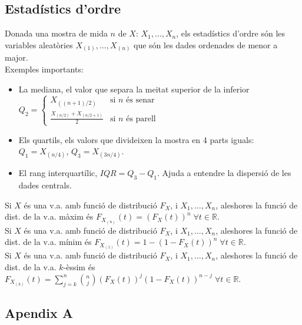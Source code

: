 \documentclass[a4paper]{sciposter}
\begin{document}
\begin{multicols}{3}
\subsection{Estadístics d'ordre}
Donada una mostra de mida $n$ de $X$: $X_1,\dots,X_n$, els estadístics d'ordre són les variables aleatòries $X_{(1)},\dots,X_{(n)}$ que són les dades ordenades de menor a major.\\
Exemples importants:
\begin{itemize}
	\item La mediana, el valor que separa la meitat superior de la inferior $Q_2 = \begin{cases}
	X_{((n+1)/2)} & \text{si $n$ és senar} \\
	\frac{X_{(n/2)} + X_{(n/2+1)}}{2} & \text{si $n$ és parell}
	\end{cases}$
	\item Els quartils, els valors que divideixen la mostra en 4 parts iguals: $Q_1 = X_{(n/4)}$, $Q_3 = X_{(3n/4)}$.
	\item El rang interquartílic, $IQR = Q_3 - Q_1$. Ajuda a entendre la dispersió de les dades centrals.
\end{itemize}
Si $X$ és una v.a. amb funció de distribució $F_X$, i $X_1,\dots,X_n$, aleshores la funció de dist. de la v.a. màxim és $F_{X_{(n)}}(t) = (F_X(t))^n\;\forall t \in \mathbb{R}$.\\
Si $X$ és una v.a. amb funció de distribució $F_X$, i $X_1,\dots,X_n$, aleshores la funció de dist. de la v.a. mínim és $F_{X_{(1)}}(t) = 1 - (1 - F_X(t))^n\;\forall t \in \mathbb{R}$.\\
Si $X$ és una v.a. amb funció de distribució $F_X$, i $X_1,\dots,X_n$, aleshores la funció de dist. de la v.a. $k$-èssim és $F_{X_{(k)}}(t) = \sum\limits_{j=k}^{n} \binom{n}{j} (F_X(t))^j (1-F_X(t))^{n-j}\;\forall t \in \mathbb{R}$.
\subsection{Apendix A}

\end{multicols}
\end{document}
